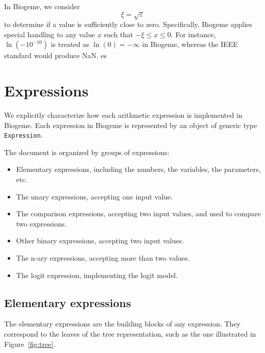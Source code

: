 \documentclass[12pt,a4paper]{article}
\begin{document}
In Biogeme, we consider 
  \[
  \xi = \sqrt{\varepsilon}
  \]
to determine if a value is sufficiently close to zero.  Specifically,
Biogeme applies special handling to any value $x$ such that $-\xi
\leq x \leq 0$. For instance, $\ln(-10^{-10})$ is treated as $\ln(0)=-\infty$ in Biogeme, whereas  the IEEE standard would produce NaN.
es
\section{Expressions}

We explicitly characterize how each
arithmetic expression is implemented in Biogeme. Each expression in
Biogeme is represented by an object of generic type
\lstinline+Expression+.



The document is organized by groups of expressions:
\begin{itemize}
\item Elementary expressions, including the numbers, the variables, the parameters, etc.
\item The unary expressions, accepting one input value.
\item The comparison expressions, accepting two input values, and used to compare two expressions.
\item Other binary expressions, accepting two input values.
\item The n-ary expressions, accepting more than two values.
\item The logit expression, implementing the logit model.
\end{itemize}



\subsection{Elementary expressions}

The elementary expressions are the building blocks of any expression. They correspond to the leaves of the tree representation, such as the one illustrated in Figure~\ref{fig:tree}.  
\end{document}
